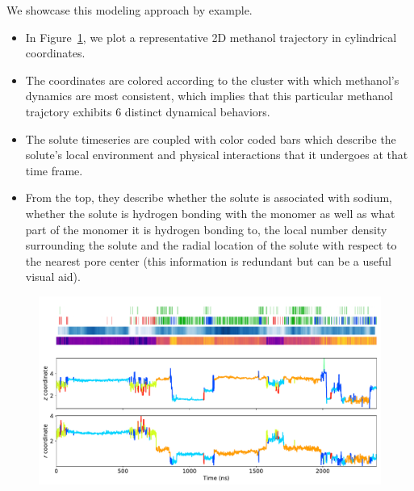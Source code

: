 \documentclass{article}
\begin{document}
  
  We showcase this modeling approach by example. 
  \begin{itemize}
    \item In Figure~\ref{fig:mechanism_map}, we plot a representative 2D methanol 
    trajectory in cylindrical coordinates.
    \item The coordinates are colored according to the cluster with which methanol's
    dynamics are most consistent, which implies that this particular methanol 
    trajctory exhibits 6 distinct dynamical behaviors. 
    \item The solute timeseries are coupled with color coded bars which describe the
    solute's local environment and physical interactions that it undergoes at that
    time frame.
    \item From the top, they describe whether the solute is associated with sodium,
    whether the solute is hydrogen bonding with the monomer as well as what part of
    the monomer it is hydrogen bonding to, the local number density surrounding the
    solute and the radial location of the solute with respect to the nearest pore
    center (this information is redundant but can be a useful visual aid). %
  \end{itemize}
  
  \begin{figure}
  \includegraphics[width=\textwidth]{mechanism_map.pdf}
  \caption{}\label{fig:mechanism_map}
  \end{figure}
  
\end{document}
